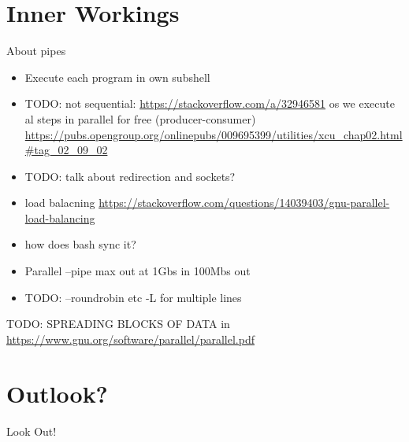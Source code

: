 \section{Inner Workings}
\begin{frame}{About pipes}
\begin{itemize}
   \item Execute each program in own subshell
   \item TODO: not sequential: \url{https://stackoverflow.com/a/32946581} os we execute al steps in parallel for free (producer-consumer) \url{https://pubs.opengroup.org/onlinepubs/009695399/utilities/xcu_chap02.html\#tag_02_09_02}
   \item TODO: talk about redirection and sockets?
   \item load balacning \url{https://stackoverflow.com/questions/14039403/gnu-parallel-load-balancing}
   \item how does bash sync it?
   \item Parallel --pipe max out at 1Gbs in 100Mbs out
   \item TODO: --roundrobin etc -L for multiple lines
\end{itemize}
\end{frame}
\begin{frame}
 TODO: SPREADING BLOCKS OF DATA
 in \url{https://www.gnu.org/software/parallel/parallel.pdf}
\end{frame}

\section{Outlook?}
\begin{frame}{Look Out!}
\end{frame}

